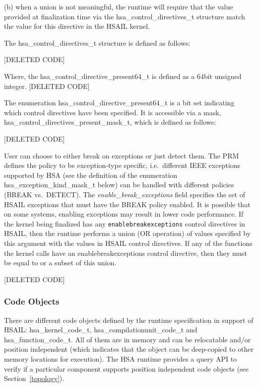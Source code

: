 \documentclass[draft]{book}
\newcommand{\reffld}[1]{\textit{#1}}
\newcommand{\reftyp}[1]{#1}
\begin{document}
(b) when a union is not meaningful, the runtime will require that the value
provided at finalization time via the \reftyp{hsa_control_directives_t}
structure match the value for this directive in the HSAIL kernel.

The \reftyp{hsa_control_directives_t} structure is defined as
follows:

[DELETED CODE]

Where, the \reftyp{hsa_control_directive_present64_t} is defined as a 64bit
unsigned integer.
[DELETED CODE]

The enumeration \reftyp{hsa_control_directive_present64_t} is a bit set
indicating which control directives have been specified. It is accessible via a
mask, \reftyp{hsa_control_directives_present_mask_t}, which is defined as
follows:

[DELETED CODE]

User can choose to either break on exceptions or just detect them. The PRM
defines the policy to be exception-type specific, i.e.\ different IEEE
exceptions supported by HSA (see the definition of the enumeration
\reftyp{hsa_exception_kind_mask_t} below) can be handled with different
policies (BREAK vs.\ DETECT). The \reffld{enable_break_exceptions} field
specifies the set of HSAIL exceptions that must have the BREAK policy
enabled. It is possible that on some systems, enabling exceptions may result in
lower code performance. If the kernel being finalized has any
\texttt{enablebreakexceptions} control directives in HSAIL, then the runtime
performs a union (OR operation) of values specified by this argument with the
values in HSAIL control directives. If any of the functions the kernel calls
have an enablebreakexceptions control directive, then they must be equal to or a
subset of this union.

[DELETED CODE]

\subsubsection{Code Objects}\label{finalize:codeobject}

There are different code objects defined by the runtime specification in support
of HSAIL: \reftyp{hsa_kernel_code_t}, \reftyp{hsa_compilationunit_code_t}
and \reftyp{hsa_function_code_t}. All of them are in memory and can be
relocatable and/or position independent (which indicates that the object can be
deep-copied to other memory locations for execution). The HSA runtime provides a
query API to verify if a particular component supports position independent code
objects (see Section~\ref{topology}).
\end{document}
